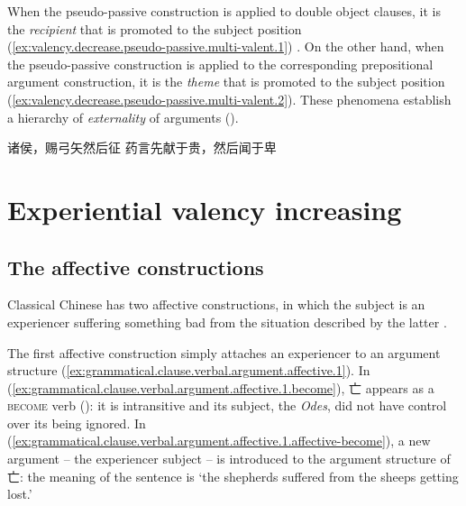 \documentclass[UTF8, a4paper, oneside, scheme=plain, 12pt]{ctexrep}
\newcommand*{\citepage}[1]{p.~{#1}}
\newcommand*{\citepages}[1]{pp.~{#1}}
\newcommand*{\term}[1]{\emph{#1}}
\newcommand{\work}[1]{\textit{#1}}
\newcommand{\translate}[1]{`#1'}
\newcommand*{\category}[1]{\textsc{#1}}
\begin{document}
When the pseudo-passive construction is applied to double object clauses,
it is the \emph{recipient} that is promoted to the subject position 
(\ref{ex:valency.decrease.pseudo-passive.multi-valent.1}) \citep[\citepage{421}]{meiguang2018}.
On the other hand, when the pseudo-passive construction is applied to the corresponding prepositional argument construction,
it is the \emph{theme} that is promoted to the subject position
(\ref{ex:valency.decrease.pseudo-passive.multi-valent.2}).
These phenomena establish a hierarchy of \term{externality} of arguments ().

\begin{exe}
    \ex\label{ex:valency.decrease.pseudo-passive.multi-valent.1} 诸侯，赐弓矢然后征
    \ex\label{ex:valency.decrease.pseudo-passive.multi-valent.2} 药言先献于贵，然后闻于卑
\end{exe}

\section{Experiential valency increasing}

\subsection{The affective constructions}

Classical Chinese has two affective constructions,
in which the subject is an experiencer suffering something bad from the situation described by the latter
\citep[\citepages{354-358}]{meiguang2018}.

The first affective construction simply attaches an experiencer to an argument structure
(\ref{ex:grammatical.clause.verbal.argument.affective.1}).
In (\ref{ex:grammatical.clause.verbal.argument.affective.1.become}),
亡 appears as a \category{become} verb ():
it is intransitive and its subject, the \work{Odes}, did not have control over its being ignored.
In (\ref{ex:grammatical.clause.verbal.argument.affective.1.affective-become}),
a new argument -- the experiencer subject -- is introduced to the argument structure of 亡:
the meaning of the sentence is \translate{the shepherds suffered from the sheeps getting lost.}
\end{document}
